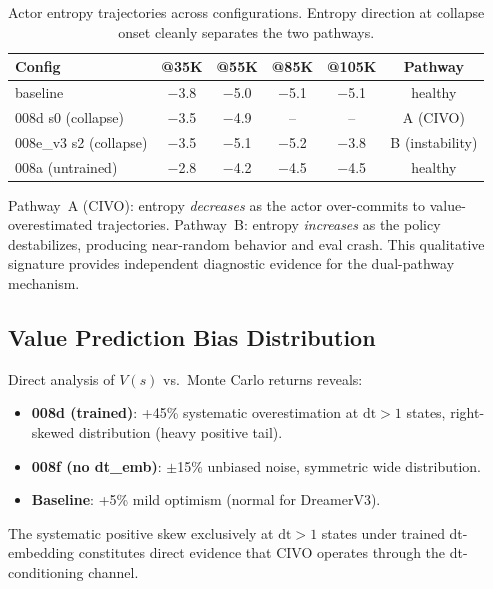 \documentclass[10pt,letterpaper]{article}
\begin{document}
\begin{table}[h]
\centering
\caption{Actor entropy trajectories across configurations. Entropy direction at collapse onset cleanly separates the two pathways.}
\label{tab:entropy}
\begin{tabular}{lccccc}
\toprule
Config & @35K & @55K & @85K & @105K & Pathway \\
\midrule
baseline & $-$3.8 & $-$5.0 & $-$5.1 & $-$5.1 & healthy \\
008d s0 (collapse) & $-$3.5 & $-$4.9 & -- & -- & A (CIVO) \\
008e\_v3 s2 (collapse) & $-$3.5 & $-$5.1 & $-$5.2 & $-$3.8 & B (instability) \\
008a (untrained) & $-$2.8 & $-$4.2 & $-$4.5 & $-$4.5 & healthy \\
\bottomrule
\end{tabular}
\end{table}

Pathway~A (CIVO): entropy \emph{decreases} as the actor over-commits to value-overestimated trajectories.
Pathway~B: entropy \emph{increases} as the policy destabilizes, producing near-random behavior and eval crash.
This qualitative signature provides independent diagnostic evidence for the dual-pathway mechanism.

\subsection{Value Prediction Bias Distribution}
\label{sec:value_dist}

Direct analysis of $V(s)$ vs.\ Monte Carlo returns reveals:
\begin{itemize}
    \item \textbf{008d (trained)}: +45\% systematic overestimation at $\mathrm{dt}>1$ states, right-skewed distribution (heavy positive tail).
    \item \textbf{008f (no dt\_emb)}: $\pm$15\% unbiased noise, symmetric wide distribution.
    \item \textbf{Baseline}: +5\% mild optimism (normal for DreamerV3).
\end{itemize}

The systematic positive skew exclusively at $\mathrm{dt}>1$ states under trained dt-embedding constitutes direct evidence that CIVO operates through the dt-conditioning channel.

\end{document}
